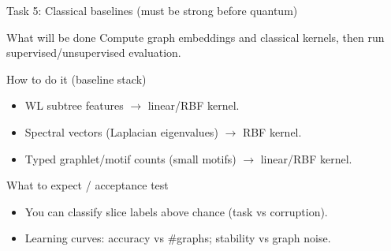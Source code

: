 \documentclass[aspectratio=169,xcolor={dvipsnames}]{beamer}
\begin{document}
\begin{frame}[shrink=20]{Task 5: Classical baselines (must be strong before quantum)}
\small
\begin{block}{What will be done}
Compute graph embeddings and classical kernels, then run supervised/unsupervised evaluation.
\end{block}

\begin{block}{How to do it (baseline stack)}
\begin{itemize}\setlength\itemsep{3pt}
\item WL subtree features $\rightarrow$ linear/RBF kernel.
\item Spectral vectors (Laplacian eigenvalues) $\rightarrow$ RBF kernel.
\item Typed graphlet/motif counts (small motifs) $\rightarrow$ linear/RBF kernel.
\end{itemize}
\end{block}

\begin{block}{What to expect / acceptance test}
\begin{itemize}\setlength\itemsep{2pt}
\item You can classify slice labels above chance (task vs corruption).
\item Learning curves: accuracy vs \#graphs; stability vs graph noise.
\end{itemize}
\end{block}
\end{frame}
\end{document}
